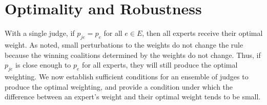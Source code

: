 \documentclass[letterpaper]{article} %
\newcommand{\judge}{\ensuremath{j} }
\newcommand{\experts}{\ensuremath{E} }
\newcommand{\expert}{\ensuremath{e} }
\begin{document}



%
%


\section{Optimality and Robustness}\label{sec:opt_robust}
With a single judge, if $p_{\judge \expert} = p_\expert$ for all $\expert \in \experts$, then all experts receive their optimal weight. As noted, small perturbations to the weights do not change the rule because the winning coalitions determined by the weights do not change. Thus, if $p_{\judge \expert}$ is close enough to $p_\expert$ for all experts, they will still produce the optimal weighting. We now establish sufficient conditions for an ensemble of judges to produce the optimal weighting, and provide a condition under which the difference between an expert's weight and their optimal weight tends to be small.
%
\end{document}
